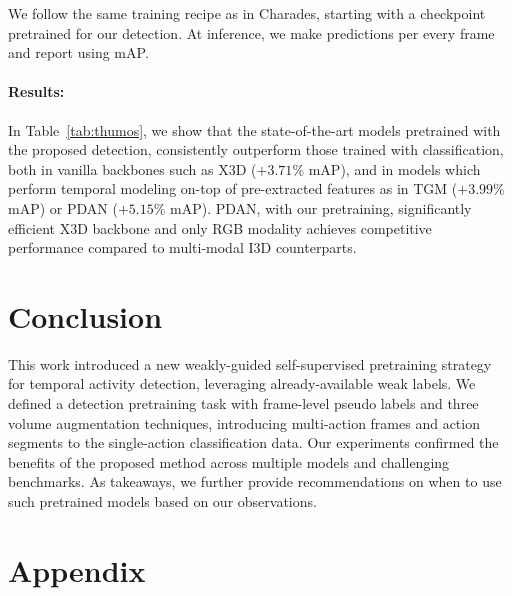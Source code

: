 \documentclass[letterpaper]{article} \usepackage{aaai23}  \usepackage{times}  \usepackage{helvet}  \usepackage{courier}  \usepackage[hyphens]{url}  \usepackage{graphicx} \urlstyle{rm} \def\UrlFont{\rm}  \usepackage{natbib}  \usepackage{caption} \frenchspacing  \setlength{\pdfpagewidth}{8.5in}  \setlength{\pdfpageheight}{11in}  \usepackage{algorithm}
\newcommand{\tref}[1]{Table~\ref{#1}}
\newcommand{\ch}{}
\begin{document}
We follow the same training recipe as in Charades, starting with a checkpoint pretrained for our detection. At inference, we make predictions per every frame and report using mAP.
\paragraph{Results:}
\label{subsubsec:main_results_thumos}

In \tref{tab:thumos}, we show that the state-of-the-art models pretrained with the proposed detection, consistently outperform those trained with classification, both in vanilla backbones such as X3D \cite{feichtenhofer2020x3d} ($+3.71\%$ mAP), and in models which perform temporal modeling on-top of pre-extracted features as in TGM \cite{piergiovanni2019temporal} ($+3.99\%$ mAP) or PDAN \cite{dai2021pdan} ($+5.15\%$ mAP). PDAN, with our pretraining, significantly efficient X3D backbone and only RGB modality achieves competitive performance compared to multi-modal I3D \cite{carreira2017quo} counterparts.



\section{Conclusion}
\label{sec:conclusion}

\ch{This work introduced a new weakly-guided self-supervised pretraining strategy for temporal activity detection, leveraging already-available weak labels.} We defined a detection pretraining task with frame-level pseudo labels and three volume augmentation techniques, introducing multi-action frames and action segments to the single-action classification data. Our experiments confirmed the benefits of the proposed method across multiple models and challenging benchmarks. As takeaways, we further provide recommendations on when to use such pretrained models based on our observations.






\section{Appendix}
\label{sec:appendix}

\renewcommand{\thesubsection}{A.\arabic{subsection}}
\renewcommand{\thesection}{\Alph{section}}
\setcounter{table}{0}
\setcounter{figure}{0}
\renewcommand{\thetable}{A.\arabic{table}}
\renewcommand{\thefigure}{A.\arabic{figure}}
\end{document}

